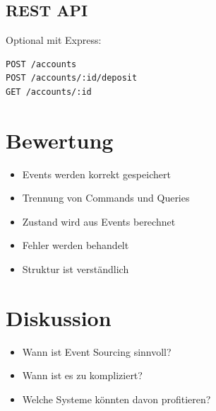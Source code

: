 \documentclass[a4paper,12pt]{article}
\begin{document}
\subsection*{REST API}

Optional mit Express:

\begin{lstlisting}
POST /accounts
POST /accounts/:id/deposit
GET /accounts/:id
\end{lstlisting}

\section*{Bewertung}

\begin{itemize}
\item Events werden korrekt gespeichert
\item Trennung von Commands und Queries
\item Zustand wird aus Events berechnet
\item Fehler werden behandelt
\item Struktur ist verständlich
\end{itemize}

\section*{Diskussion}

\begin{itemize}
\item Wann ist Event Sourcing sinnvoll?
\item Wann ist es zu kompliziert?
\item Welche Systeme könnten davon profitieren?
\end{itemize}
\end{document}
